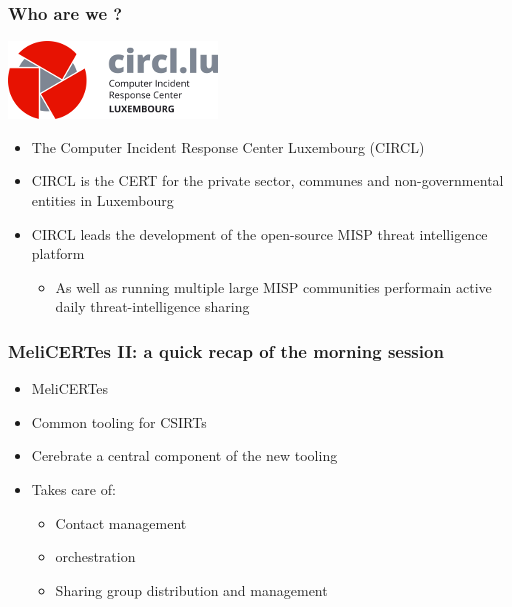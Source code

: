 
\begin{frame}[t,plain]
\titlepage
\end{frame}


\begin{frame}
\frametitle{Who are we ?}
    \begin{center}
        \includegraphics[width=0.3\linewidth]{pictures/circl.png}
    \end{center}
    \begin{itemize}
        \item The Computer Incident Response Center Luxembourg (CIRCL)
        \item CIRCL is the CERT for the private sector, communes and non-governmental entities in Luxembourg
        \item CIRCL leads the development of the open-source MISP threat intelligence platform
        \begin{itemize}
            \item As well as running multiple large MISP communities performain active daily threat-intelligence sharing
        \end{itemize}
    \end{itemize}
\end{frame}

\begin{frame}
\frametitle{MeliCERTes II: a quick recap of the morning session}
    \begin{itemize}
        \item MeliCERTes
        \item Common tooling for CSIRTs
        \item Cerebrate a central component of the new tooling
        \item Takes care of:
        \begin{itemize}
            \item Contact management
            \item orchestration
            \item Sharing group distribution and management
        \end{itemize}
    \end{itemize}
\end{frame}

